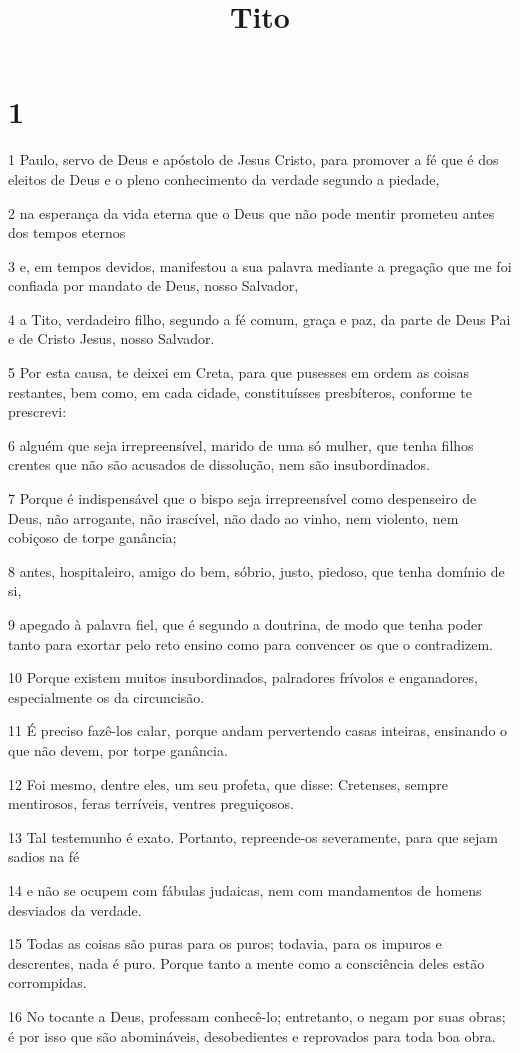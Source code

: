 

\title{Tito}


\chapter{1}

\par 1 Paulo, servo de Deus e apóstolo de Jesus Cristo, para promover a fé que é dos eleitos de Deus e o pleno conhecimento da verdade segundo a piedade,
\par 2 na esperança da vida eterna que o Deus que não pode mentir prometeu antes dos tempos eternos
\par 3 e, em tempos devidos, manifestou a sua palavra mediante a pregação que me foi confiada por mandato de Deus, nosso Salvador,
\par 4 a Tito, verdadeiro filho, segundo a fé comum, graça e paz, da parte de Deus Pai e de Cristo Jesus, nosso Salvador.
\par 5 Por esta causa, te deixei em Creta, para que pusesses em ordem as coisas restantes, bem como, em cada cidade, constituísses presbíteros, conforme te prescrevi:
\par 6 alguém que seja irrepreensível, marido de uma só mulher, que tenha filhos crentes que não são acusados de dissolução, nem são insubordinados.
\par 7 Porque é indispensável que o bispo seja irrepreensível como despenseiro de Deus, não arrogante, não irascível, não dado ao vinho, nem violento, nem cobiçoso de torpe ganância;
\par 8 antes, hospitaleiro, amigo do bem, sóbrio, justo, piedoso, que tenha domínio de si,
\par 9 apegado à palavra fiel, que é segundo a doutrina, de modo que tenha poder tanto para exortar pelo reto ensino como para convencer os que o contradizem.
\par 10 Porque existem muitos insubordinados, palradores frívolos e enganadores, especialmente os da circuncisão.
\par 11 É preciso fazê-los calar, porque andam pervertendo casas inteiras, ensinando o que não devem, por torpe ganância.
\par 12 Foi mesmo, dentre eles, um seu profeta, que disse: Cretenses, sempre mentirosos, feras terríveis, ventres preguiçosos.
\par 13 Tal testemunho é exato. Portanto, repreende-os severamente, para que sejam sadios na fé
\par 14 e não se ocupem com fábulas judaicas, nem com mandamentos de homens desviados da verdade.
\par 15 Todas as coisas são puras para os puros; todavia, para os impuros e descrentes, nada é puro. Porque tanto a mente como a consciência deles estão corrompidas.
\par 16 No tocante a Deus, professam conhecê-lo; entretanto, o negam por suas obras; é por isso que são abomináveis, desobedientes e reprovados para toda boa obra.

